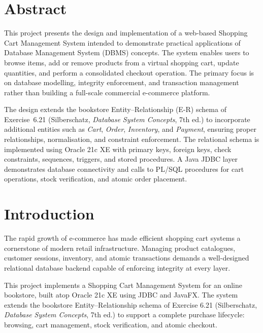 \documentclass[12pt, a4paper]{article}
\begin{document}

\maketitle
\thispagestyle{fancy}
\tableofcontents
\newpage


\section{Abstract}

This project presents the design and implementation of a web-based Shopping Cart
Management System intended to demonstrate practical applications of Database Management
System (DBMS) concepts. The system enables users to browse items, add or remove products
from a virtual shopping cart, update quantities, and perform a consolidated checkout
operation. The primary focus is on database modelling, integrity enforcement, and
transaction management rather than building a full-scale commercial e-commerce platform.

The design extends the bookstore Entity--Relationship (E-R) schema of Exercise~6.21
(Silberschatz, \textit{Database System Concepts}, 7th ed.) to incorporate additional
entities such as \textit{Cart}, \textit{Order}, \textit{Inventory}, and \textit{Payment},
ensuring proper relationships, normalisation, and constraint enforcement. The relational
schema is implemented using Oracle 21c XE with primary keys, foreign keys, check
constraints, sequences, triggers, and stored procedures. A Java JDBC layer demonstrates
database connectivity and calls to PL/SQL procedures for cart operations, stock
verification, and atomic order placement.

\section{Introduction}

The rapid growth of e-commerce has made efficient shopping cart systems a
cornerstone of modern retail infrastructure. Managing product catalogues,
customer sessions, inventory, and atomic transactions demands a well-designed
relational database backend capable of enforcing integrity at every layer.

This project implements a Shopping Cart Management System for an online
bookstore, built atop Oracle 21c XE using JDBC and JavaFX. The system extends
the bookstore Entity--Relationship schema of Exercise 6.21 (Silberschatz,
\textit{Database System Concepts}, 7th ed.) to support a complete purchase
lifecycle: browsing, cart management, stock verification, and atomic checkout.
\end{document}
